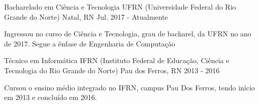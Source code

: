 

\begin{cventries}

  \cventry
    {Bacharelado em Ciência e Tecnologia} %
    {UFRN (Universidade Federal do Rio Grande do Norte)} %
    {Natal, RN} %
    {Jul. 2017 - Atualmente} %
    {
      \begin{cvitems} %
        \item {Ingressou no curso de Ciência e Tecnologia, grau de bacharel, da UFRN no ano de 2017. Segue a ênfase de Engenharia de Computação}
      \end{cvitems}
    }

  \cventry
    {Técnico em Informática} %
    {IFRN (Instituto Federal de Educação, Ciência e Tecnologia do Rio Grande do Norte)} %
    {Pau dos Ferros, RN} %
    {2013 - 2016} %
    {
      \begin{cvitems} %
        \item {Cursou o ensino médio integrado no IFRN, campus Pau Dos Ferros, tendo início em 2013 e concluído em 2016.}
      \end{cvitems}
    }

\end{cventries}
